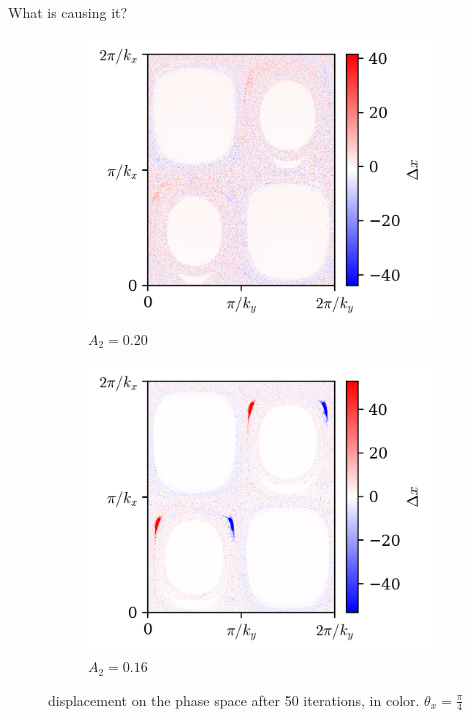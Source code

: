 \documentclass[10pt]{beamer}
\begin{document}
\begin{frame}{What is causing it?}

\begin{figure}
    \begin{subfigure}[b]{0.45\textwidth}
        \includegraphics[width=\textwidth]{graf_2ondas/anom1.png}
        \caption{$A_2 = 0.20$}
    \end{subfigure}
    \begin{subfigure}[b]{0.45\textwidth}
        \includegraphics[width=\textwidth]{graf_2ondas/anom2.png}
        \caption{$A_2 = 0.16$}
    \end{subfigure}


    \caption{displacement on the phase space after 50 iterations, in color. $\theta_x = \frac{\pi}{4}$}
\end{figure}

\end{frame}
\end{document}

